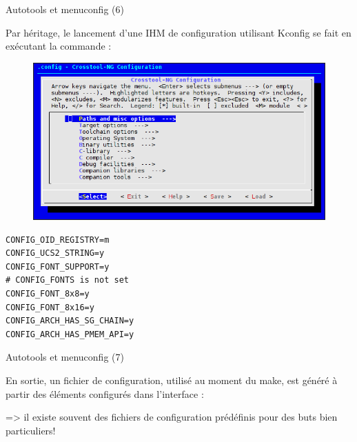 \documentclass[12pt, t]{beamer}
\begin{document}
\begin{frame}{Autotools et menuconfig (6)}

    \vspace{15pt}
    Par héritage, le lancement d'une IHM de configuration utilisant Kconfig se
    fait en exécutant la commande :

    \vspace{5pt}
    \lstmenu

    {
        \begin{figure}
            \centering
            \includegraphics[scale=0.5]{ct-ng.png}
        \end{figure}
    }
\end{frame}

{
    \begin{lstlisting}
CONFIG_OID_REGISTRY=m
CONFIG_UCS2_STRING=y
CONFIG_FONT_SUPPORT=y
# CONFIG_FONTS is not set
CONFIG_FONT_8x8=y
CONFIG_FONT_8x16=y
CONFIG_ARCH_HAS_SG_CHAIN=y
CONFIG_ARCH_HAS_PMEM_API=y
    \end{lstlisting}
}

\begin{frame}{Autotools et menuconfig (7)}

    \vspace{15pt}
    En sortie, un fichier de configuration, utilisé au moment du make, est
    généré à partir des éléments configurés dans l'interface :

    \vspace{10pt}
    \lstkconf

    {
        => il existe souvent des fichiers de configuration prédéfinis pour des
        buts bien particuliers!
    }
\end{frame}
\end{document}

